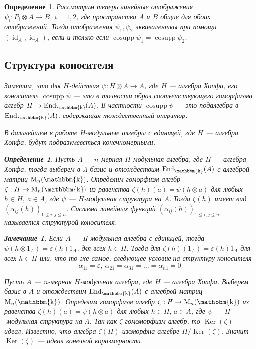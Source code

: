 \documentclass[12pt, reqno, a4paper, oneside, notitlepage]{amsart}
\theoremstyle{mytheoremstyle}
\theoremstyle{myremarkstyle}
\newtheorem{remark}[theorem]{Замечание}
\newtheorem{definition}[theorem]{Определение}
\numberwithin{equation}{section}
\DeclareMathOperator{\id}{id}
\DeclareMathOperator{\cosupp}{cosupp}
\DeclareMathOperator{\End}{End}
\DeclareMathOperator{\Ker}{Ker}
\DeclareMathOperator{\fld}{\mathbbm{k}}
\begin{document}
\begin{definition}
Рассмотрим теперь линейные отображения $\psi_i: P_i \otimes A \to B,\ i = 1,2$, где пространства $A$ и $B$ общие для обоих отображений.
Тогда отображения $\psi_1, \psi_2$ эквивалентны при помощи $(\id_A, \id_A)$, если и только если $\cosupp \psi_1 = \cosupp \psi_2$.

\subsection{Структура коносителя}

Заметим, что для $H$-действия $\psi: H \otimes A \to A$, где $H$ --- алгебра Хопфа, его коноситель $\cosupp \psi$ --- это в точности образ соответствующего гоморфизма алгебр
$H \to \End_{\fld}(A)$. В частности $\cosupp \psi$ --- это подалгебра в $\End_{\fld}(A)$, содержащая тождественный оператор.

В дальнейшем в работе $H$-модульные алгебры с единицей, где $H$ --- алгебра Хопфа, будут подразумеваться конечномерными.

\begin{definition} \label{struct cosupp}
  Пусть $A$ --- $n$-мерная $H$-модульная алгебра, где $H$ --- алгебра Хопфа, тогда выберем в $A$ базис и 
  отождествим $\End_{\fld}(A)$ с алгеброй матриц $\mathrm{M}_n(\fld)$. Определим гоморфизм алгебр $\zeta: H \to \mathrm{M}_n(\fld)$ из равенства 
  $\zeta(h)(a) = \psi(h \otimes a)$ для любых $h \in H,\ a \in A$, где $\psi$ --- $H$-модульная структура на $A$.
  Тогда $\zeta(h)$ имеет вид $\left(\alpha_{ij}(h)\right)_{1 \leq i, j \leq n}$.
  Система линейных функций $\left(\alpha_{ij}(h)\right)_{1 \leq i, j \leq n}$ называется \textit{структурой коносителя}.
\end{definition}

\begin{remark} \label{struct cosupp with 1}
  Если $A$ --- $H$-модульная алгебра с единицей, тогда $\psi(h \otimes 1_A) = \varepsilon(h)1_A$, для всех $h \in H$.
  Тогда для $\zeta(h)(1_A) = \varepsilon(h)1_A$ для всех $h \in H$ или, что то же самое, следующее условие на структуру коносителя
  \[
	\alpha_{11} = \varepsilon,\ \alpha_{21} = \alpha_{31} = \dots = \alpha_{n1} = 0
  \]
\end{remark}

Пусть $A$ --- $n$-мерная $H$-модульная алгебра, где $H$ --- алгебра Хопфа. Выберем базис в $A$ и отождествим $\End_{\fld}(A)$ с алгеброй матриц $\mathrm{M}_n(\fld)$.
Определим гоморфизм алгебр $\zeta: H \to \mathrm{M}_n(\fld)$ из равенства 
$\zeta(h)(a) = \psi(h \otimes a)$ для любых $h \in H,\ a \in A$, где $\psi$ --- $H$-модульная структура на $A$.
Так как $\zeta$ гомоморфизм алгебр, то $\Ker(\zeta)$ --- идеал. Известно, что алгебра $\zeta(H)$ изоморфна алгебре $H/\Ker(\zeta)$. 
Значит $\Ker(\zeta)$ --- идеал конечной коразмерности. 


\end{definition}
\end{document}
